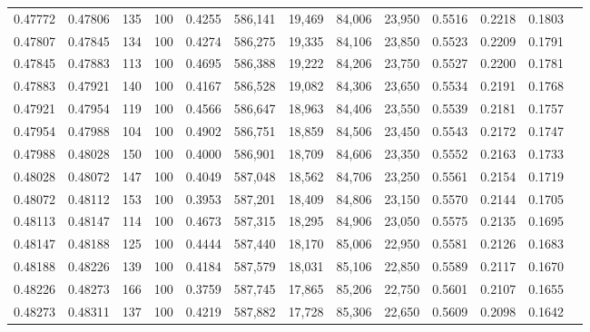 \begin{tabular}{rrrrrrrrrrrrr}
0.47772 & 0.47806 &    135 & 100 &                                     0.4255 & 586,141 &  19,469 &  84,006 &  23,950 & 0.5516 & 0.2218 & 0.1803 \\
0.47807 & 0.47845 &    134 & 100 &                                     0.4274 & 586,275 &  19,335 &  84,106 &  23,850 & 0.5523 & 0.2209 & 0.1791 \\
0.47845 & 0.47883 &    113 & 100 &                                     0.4695 & 586,388 &  19,222 &  84,206 &  23,750 & 0.5527 & 0.2200 & 0.1781 \\
0.47883 & 0.47921 &    140 & 100 &                                     0.4167 & 586,528 &  19,082 &  84,306 &  23,650 & 0.5534 & 0.2191 & 0.1768 \\
0.47921 & 0.47954 &    119 & 100 &                                     0.4566 & 586,647 &  18,963 &  84,406 &  23,550 & 0.5539 & 0.2181 & 0.1757 \\
0.47954 & 0.47988 &    104 & 100 &                                     0.4902 & 586,751 &  18,859 &  84,506 &  23,450 & 0.5543 & 0.2172 & 0.1747 \\
0.47988 & 0.48028 &    150 & 100 &                                     0.4000 & 586,901 &  18,709 &  84,606 &  23,350 & 0.5552 & 0.2163 & 0.1733 \\
0.48028 & 0.48072 &    147 & 100 &                                     0.4049 & 587,048 &  18,562 &  84,706 &  23,250 & 0.5561 & 0.2154 & 0.1719 \\
0.48072 & 0.48112 &    153 & 100 &                                     0.3953 & 587,201 &  18,409 &  84,806 &  23,150 & 0.5570 & 0.2144 & 0.1705 \\
0.48113 & 0.48147 &    114 & 100 &                                     0.4673 & 587,315 &  18,295 &  84,906 &  23,050 & 0.5575 & 0.2135 & 0.1695 \\
0.48147 & 0.48188 &    125 & 100 &                                     0.4444 & 587,440 &  18,170 &  85,006 &  22,950 & 0.5581 & 0.2126 & 0.1683 \\
0.48188 & 0.48226 &    139 & 100 &                                     0.4184 & 587,579 &  18,031 &  85,106 &  22,850 & 0.5589 & 0.2117 & 0.1670 \\
0.48226 & 0.48273 &    166 & 100 &                                     0.3759 & 587,745 &  17,865 &  85,206 &  22,750 & 0.5601 & 0.2107 & 0.1655 \\
0.48273 & 0.48311 &    137 & 100 &                                     0.4219 & 587,882 &  17,728 &  85,306 &  22,650 & 0.5609 & 0.2098 & 0.1642 \\

\end{tabular}
